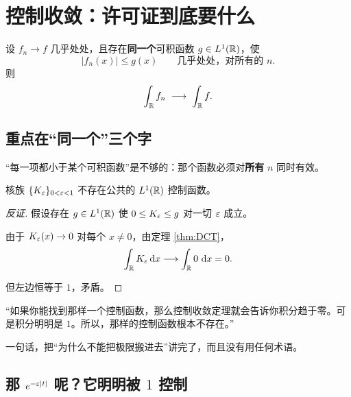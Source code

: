 \section{控制收敛：许可证到底要什么}

\begin{thm}\label{thm:DCT}
设 $f_n\to f$ 几乎处处，且存在\textbf{同一个}可积函数 $g\in L^1(\mathbb{R})$，使
\begin{equation}
|f_n(x)|\le g(x)\qquad\text{几乎处处，对所有的 }n .
\end{equation}
则
\begin{equation}
\int_{\mathbb{R}}f_n\;\longrightarrow\;\int_{\mathbb{R}}f .
\end{equation}
\end{thm}

\subsection{重点在“同一个”三个字}

“每一项都小于某个可积函数”是不够的：那个函数必须对\textbf{所有} $n$ 同时有效。

\begin{prop}\label{prop:noControl}
核族 $\{K_\varepsilon\}_{0<\varepsilon<1}$ 不存在公共的 $L^1(\mathbb{R})$ 控制函数。
\end{prop}

\begin{proof}[反证]
假设存在 $g\in L^1(\mathbb{R})$ 使 $0\le K_\varepsilon\le g$ 对一切 $\varepsilon$ 成立。

由于 $K_\varepsilon(x)\to0$ 对每个 $x\neq0$，由定理 \ref{thm:DCT}，
\begin{equation}
\int_{\mathbb{R}}K_\varepsilon\mathop{}\!\mathrm{d} x\longrightarrow\int_{\mathbb{R}}0\,\mathop{}\!\mathrm{d} x=0 .
\end{equation}

但左边恒等于 $1$，矛盾。
\end{proof}

\begin{ideabox}[这个反证法本身就是一句很好的旁白]
“如果你能找到那样一个控制函数，那么控制收敛定理就会告诉你积分趋于零。可是积分明明是 $1$。所以，那样的控制函数根本不存在。”

一句话，把“为什么不能把极限搬进去”讲完了，而且没有用任何术语。
\end{ideabox}

\subsection{那 $e^{-\varepsilon|t|}$ 呢？它明明被 $1$ 控制}

